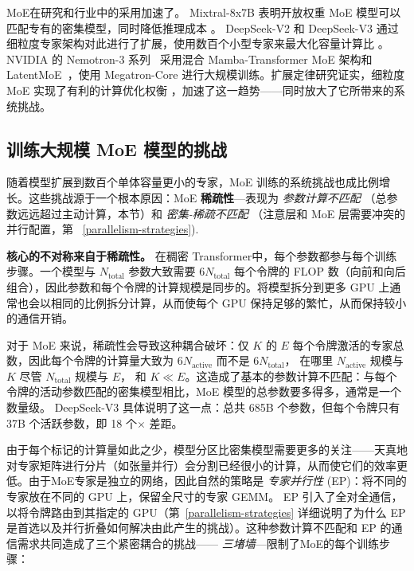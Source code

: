 \documentclass[10pt,logo,copyright]{nvidiatechreport_zh}
\begin{document}
MoE在研究和行业中的采用加速了。 Mixtral-8x7B 表明开放权重 MoE 模型可以匹配专有的密集模型，同时降低推理成本 \cite{jiang2024mixtralexperts}。 DeepSeek-V2 和 DeepSeek-V3 通过细粒度专家架构对此进行了扩展，使用数百个小型专家来最大化容量计算比 \cite{dai2024deepseekmoe,deepseekai2024deepseekv2strongeconomicalefficient,deepseekai2025deepseekv3technicalreport}。 NVIDIA 的 Nemotron-3 系列~\cite{nvidia2025nemotron3} 采用混合 Mamba-Transformer MoE 架构和 LatentMoE~\cite{elango2026latentmoe}，使用 Megatron-Core 进行大规模训练。扩展定律研究证实，细粒度 MoE 实现了有利的计算优化权衡 \cite{krajewski2024scaling,ludziejewski2025jointmoescalinglaws}，加速了这一趋势——同时放大了它所带来的系统挑战。

\subsection{训练大规模 MoE 模型的挑战}\label{sec:challenges}

随着模型扩展到数百个单体容量更小的专家，MoE 训练的系统挑战也成比例增长。这些挑战源于一个根本原因：MoE \textbf{稀疏性}---表现为 \emph{参数计算不匹配} （总参数远远超过主动计算，本节）和 \emph{密集-稀疏不匹配} （注意层和 MoE 层需要冲突的并行配置，第 ~\ref{parallelism-strategies}).

\textbf{核心的不对称来自于稀疏性。} 在稠密 Transformer中，每个参数都参与每个训练步骤。一个模型与 $N_{\text{total}}$ 参数大致需要 $6 N_{\text{total}}$ 每个令牌的 FLOP 数（向前和向后组合），因此参数和每个令牌的计算规模是同步的。将模型拆分到更多 GPU 上通常也会以相同的比例拆分计算，从而使每个 GPU 保持足够的繁忙，从而保持较小的通信开销。

对于 MoE 来说，稀疏性会导致这种耦合破坏：仅 $K$ 的 $E$ 每个令牌激活的专家总数，因此每个令牌的计算量大致为 $6 N_{\text{active}}$ 而不是 $6 N_{\text{total}}$， 在哪里 $N_{\text{active}}$ 规模与 $K$ 尽管 $N_{\text{total}}$ 规模与 $E$， 和 $K \ll E$。这造成了基本的参数计算不匹配：与每个令牌的活动参数匹配的密集模型相比，MoE 模型的总参数要多得多，通常是一个数量级。 DeepSeek-V3 具体说明了这一点：总共 685B 个参数，但每个令牌只有 37B 个活跃参数，即 18 个$\times$ 差距。

由于每个标记的计算量如此之少，模型分区比密集模型需要更多的关注——天真地对专家矩阵进行分片（如张量并行）会分割已经很小的计算，从而使它们的效率更低。由于MoE专家是独立的网络，因此自然的策略是 \emph{专家并行性} (EP)：将不同的专家放在不同的 GPU 上，保留全尺寸的专家 GEMM。 EP 引入了全对全通信，以将令牌路由到其指定的 GPU（第~\ref{parallelism-strategies} 详细说明了为什么 EP 是首选以及并行折叠如何解决由此产生的挑战）。这种参数计算不匹配和 EP 的通信需求共同造成了三个紧密耦合的挑战—— \emph{三堵墙}---限制了MoE的每个训练步骤：
\end{document}
